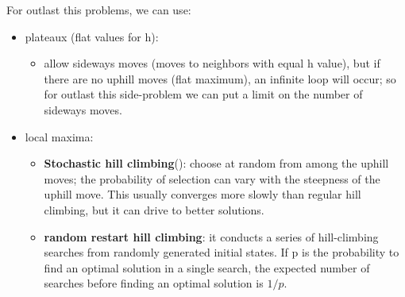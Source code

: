 \documentclass[12pt]{article}
\begin{document}
\begin{enumerate}[label=\textbf{IS.II.\arabic*}]
    For outlast this problems, we can use:
    \begin{itemize}
        \item plateaux (flat values for h):
        \begin{itemize}
            \item allow sideways moves (moves to neighbors with equal h value), but if there are no uphill moves (flat maximum), 
            an infinite loop will occur; so for outlast this side-problem we can put a limit on the number of sideways moves.
        \end{itemize}
        \item local maxima:
        \begin{itemize}
            \item \textbf{Stochastic hill climbing}(): choose at random from among the uphill moves; the probability of selection can vary with the steepness of the uphill move.
            This usually converges more slowly than regular hill climbing, but it can drive to better solutions.
            \item \textbf{random restart hill climbing}: 
            it conducts a series of hill-climbing searches from randomly generated initial states.
            If p is the probability to find an optimal solution in a single search, the expected number of searches before finding an optimal solution is $1/p$.
            

\end{itemize}
\end{itemize}
\end{enumerate}
\end{document}

